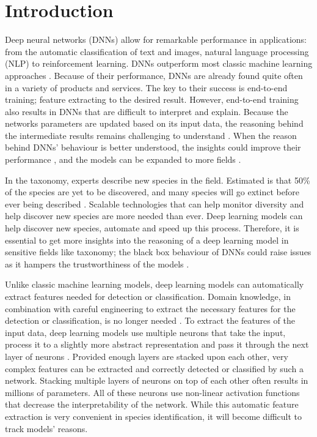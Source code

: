 \documentclass[a4paper, 12pt, oneside]{book} %
\begin{document}
\section{Introduction}
Deep neural networks (DNNs) allow for remarkable performance in applications: from the automatic classification of text and images, natural language processing (NLP) to reinforcement learning.
DNNs outperform most classic machine learning approaches \autocite{he_delving_2015, brown_language_2020}.
Because of their performance, DNNs are already found quite often in a variety of products and services.
The key to their success is end-to-end training; feature extracting to the desired result.
However, end-to-end training also results in DNNs that are difficult to interpret and explain.
Because the networks parameters are updated based on its input data, the reasoning behind the intermediate results remains challenging to understand \autocite{li_interpretable_2021, losch_interpretability_2019}.
When the reason behind DNNs' behaviour is better understood, the insights could improve their performance \autocite{amershi_modeltracker_2015}, and the models can be expanded to more fields \autocite{lei_opening_2018}.

In the taxonomy, experts describe new species in the field.
Estimated is that 50\% of the species are yet to be discovered, and many species will go extinct before ever being described \autocite{lees_species_2015}.
Scalable technologies that can help monitor diversity and help discover new species are more needed than ever.
Deep learning models can help discover new species, automate and speed up this process.
Therefore, it is essential to get more insights into the reasoning of a deep learning model in sensitive fields like taxonomy; the black box behaviour of DNNs could raise issues as it hampers the trustworthiness of the models \autocite{carvalho_machine_2019}.

Unlike classic machine learning models, deep learning models can automatically extract features needed for detection or classification.
Domain knowledge, in combination with careful engineering to extract the necessary features for the detection or classification, is no longer needed \autocite{lecun_deep_2015}.
To extract the features of the input data, deep learning models use multiple neurons that take the input, process it to a slightly more abstract representation and pass it through the next layer of neurons \autocite{schmidhuber_deep_2015}.
Provided enough layers are stacked upon each other, very complex features can be extracted and correctly detected or classified by such a network.
Stacking multiple layers of neurons on top of each other often results in millions of parameters.
All of these neurons use non-linear activation functions that decrease the interpretability of the network.
While this automatic feature extraction is very convenient in species identification, it will become difficult to track models' reasons.
\end{document}
